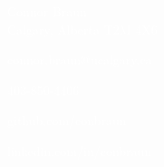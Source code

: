 \documentclass[12pt]{resume}
\newcommand*{\img}[1]{
    \raisebox{-.6\baselineskip}{
        \texttt{[image: \#1]}
    }
}
\begin{document}
\advance\topmargin -0.75cm \enlargethispage{0.75cm}
\noindent
\begin{minipage}{2\textwidth}
    \begin{flushleft}
        \HUGE
        \textcolor{white}{Connor Braun}\\[5pt]
        \hspace{0.1cm}\large{\textcolor{white}{Calgary, Alberta T2M 4X6}}\\[10pt]
        \normalsize{
            \img{figures/email_icon.png}\textcolor{white}{connor.braun@ucalgary.ca}\vspace{12pt}
            \img{figures/phone_icon.png}\textcolor{white}{403-850-4406}\vspace{12pt}
            \img{figures/github_icon.png}\textcolor{white}{github.com/conbraun}\vspace{12pt}
            \img{figures/linkedin_icon.png}\textcolor{white}{linkedin.com/in/conbraun}
        }
    \end{flushleft}
\end{minipage}
\end{document}

